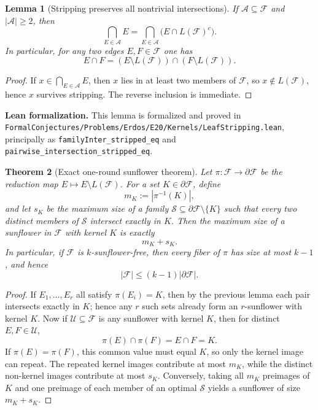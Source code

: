 \documentclass[11pt]{article}
\newtheorem{theorem}{Theorem}[section]
\newtheorem{lemma}[theorem]{Lemma}
\theoremstyle{definition}
\newcommand{\1}{\mathbf{1}}
\newcommand{\leannote}[1]{\par\smallskip\noindent\textbf{Lean formalization.} #1\par\smallskip}
\begin{document}
\begin{lemma}[Stripping preserves all nontrivial intersections]
If $\mathcal A\subseteq \mathcal F$ and $|\mathcal A|\ge 2$, then
\[
\bigcap_{E\in \mathcal A} E = \bigcap_{E\in \mathcal A} \bigl(E\cap L(\mathcal F)^c\bigr).
\]
In particular, for any two edges $E,F\in\mathcal F$ one has
\[
E\cap F=(E\setminus L(\mathcal F))\cap(F\setminus L(\mathcal F)).
\]
\end{lemma}

\begin{proof}
If $x\in \bigcap_{E\in\mathcal A}E$, then $x$ lies in at least two members of $\mathcal F$, so $x\notin L(\mathcal F)$, hence $x$ survives stripping. The reverse inclusion is immediate.
\end{proof}

\leannote{This lemma is formalized and proved in \texttt{FormalConjectures/Problems/Erdos/E20/Kernels/LeafStripping.lean}, principally as \texttt{familyInter\_stripped\_eq} and \texttt{pairwise\_intersection\_stripped\_eq}.}

\begin{theorem}[Exact one-round sunflower theorem]\label{thm:one-round-sunflower}
Let $\pi:\mathcal F\to \partial\mathcal F$ be the reduction map $E\mapsto E\setminus L(\mathcal F)$. For a set $K\in \partial\mathcal F$, define
\[
m_K:=|\pi^{-1}(K)|,
\]
and let $s_K$ be the maximum size of a family $\mathcal S\subseteq \partial\mathcal F\setminus\{K\}$ such that every two distinct members of $\mathcal S$ intersect exactly in $K$. Then the maximum size of a sunflower in $\mathcal F$ with kernel $K$ is exactly
\[
m_K+s_K.
\]
In particular, if $\mathcal F$ is $k$-sunflower-free, then every fiber of $\pi$ has size at most $k-1$, and hence
\[
|\mathcal F|\le (k-1)|\partial \mathcal F|.
\]
\end{theorem}

\begin{proof}
If $E_1,\dots,E_r$ all satisfy $\pi(E_i)=K$, then by the previous lemma each pair intersects exactly in $K$; hence any $r$ such sets already form an $r$-sunflower with kernel $K$.
Now if $\mathcal U\subseteq \mathcal F$ is any sunflower with kernel $K$, then for distinct $E,F\in\mathcal U$,
\[
\pi(E)\cap \pi(F)=E\cap F=K.
\]
If $\pi(E)=\pi(F)$, this common value must equal $K$, so only the kernel image can repeat. The repeated kernel images contribute at most $m_K$, while the distinct non-kernel images contribute at most $s_K$. Conversely, taking all $m_K$ preimages of $K$ and one preimage of each member of an optimal $\mathcal S$ yields a sunflower of size $m_K+s_K$.
\end{proof}
\end{document}
